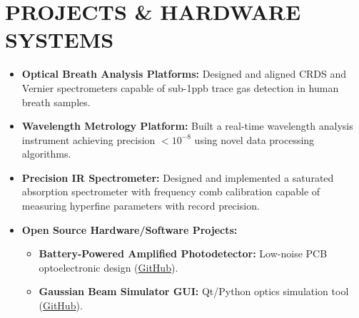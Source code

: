 \documentclass[a4paper,11pt]{extarticle}
\begin{document}
	\section*{PROJECTS \& HARDWARE SYSTEMS}
	\begin{itemize}[leftmargin=1.2em, itemsep=0.3em]
		\item \textbf{Optical Breath Analysis Platforms:} Designed and aligned CRDS and Vernier spectrometers capable of sub-1ppb trace gas detection in human breath samples.
		\item \textbf{Wavelength Metrology Platform:} Built a real-time wavelength analysis instrument achieving precision $< 10^{-8}$ using novel data processing algorithms.
		\item \textbf{Precision IR Spectrometer:} Designed and implemented a saturated absorption spectrometer with frequency comb calibration capable of measuring hyperfine parameters with record precision.
		\item \textbf{Open Source Hardware/Software Projects:} 
		\begin{itemize}[leftmargin=1em, itemsep=0.1em]
			\item \textbf{Battery-Powered Amplified Photodetector:} Low-noise PCB optoelectronic design (\href{https://github.com/jaymz07/Photodetector-Battery}{GitHub}).
			\item \textbf{Gaussian Beam Simulator GUI:} Qt/Python optics simulation tool (\href{https://github.com/jaymz07/Gaussian-Beam-Sim-Qt}{GitHub}).
		\end{itemize}
	\end{itemize}
	
\end{document}
